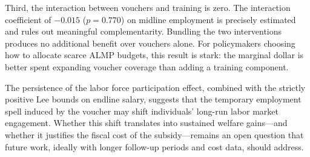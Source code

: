 \documentclass[12pt]{article}
\begin{document}
Third, the interaction between vouchers and training is zero. The interaction coefficient of $-0.015$ ($p = 0.770$) on midline employment is precisely estimated and rules out meaningful complementarity. Bundling the two interventions produces no additional benefit over vouchers alone. For policymakers choosing how to allocate scarce ALMP budgets, this result is stark: the marginal dollar is better spent expanding voucher coverage than adding a training component.

The persistence of the labor force participation effect, combined with the strictly positive Lee bounds on endline salary, suggests that the temporary employment spell induced by the voucher may shift individuals' long-run labor market engagement. Whether this shift translates into sustained welfare gains---and whether it justifies the fiscal cost of the subsidy---remains an open question that future work, ideally with longer follow-up periods and cost data, should address.


\clearpage


\end{document}
